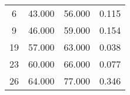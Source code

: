 % 
\begin{tabular}{cccc}
  \hline
  \hline
6 & 43.000 & 56.000 & 0.115 \\ 
  9 & 46.000 & 59.000 & 0.154 \\ 
  19 & 57.000 & 63.000 & 0.038 \\ 
  23 & 60.000 & 66.000 & 0.077 \\ 
  26 & 64.000 & 77.000 & 0.346 \\ 
   \hline
\end{tabular}
